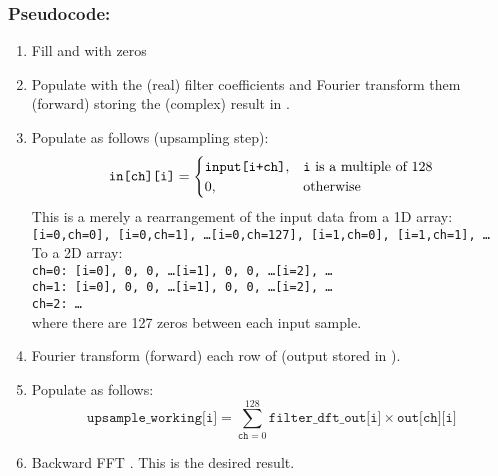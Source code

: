 \documentclass{article}
\begin{document}
\subsubsection*{Pseudocode:}
\begin{enumerate}
    \item Fill  and  with zeros
    \item Populate  with the (real) filter coefficients and Fourier transform them (forward) storing the (complex) result in .
    \item Populate  as follows (upsampling step):
        \begin{equation}
            \texttt{in[ch][i]} =
            \begin{cases}
                \texttt{input[i+ch]}, & \text{\texttt{i} is a multiple of 128} \\
                0, & \text{otherwise}
            \end{cases}
        \end{equation}
        This is a merely a rearrangement of the input data from a 1D array:\\[8pt]
        \texttt{[i=0,ch=0], [i=0,ch=1], \dots [i=0,ch=127], [i=1,ch=0], [i=1,ch=1], \dots}\\[8pt]
        To a 2D array:\\[8pt]
        \texttt{ch=0: [i=0], 0, 0, \dots [i=1], 0, 0, \dots [i=2], \dots}\\
        \texttt{ch=1: [i=0], 0, 0, \dots [i=1], 0, 0, \dots [i=2], \dots}\\
        \texttt{ch=2: \dots}\\[8pt]
        where there are 127 zeros between each input sample.
    \item Fourier transform (forward) each row of  (output stored in ).
    \item Populate  as follows:
        \begin{equation}
            \texttt{upsample\_working[i]}
              = \sum_{\texttt{ch}=0}^{128} \texttt{filter\_dft\_out[i]} \times \texttt{out[ch][i]}
        \end{equation}
    \item Backward FFT . This is the desired result.
\end{enumerate}

\end{document}
